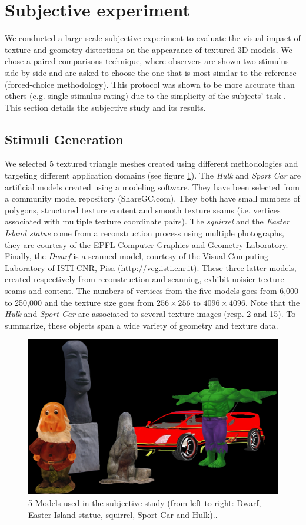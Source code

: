 \section{Subjective experiment}
We conducted a large-scale subjective experiment to evaluate the visual impact of texture and geometry distortions on the appearance of textured 3D models. We chose a paired comparisons technique, where observers are shown two stimulus side by side and are asked to choose the one that is most similar to the reference (forced-choice methodology). This protocol was shown to be more accurate than others (e.g. single stimulus rating) due to the simplicity of the subjects’ task \cite{Mantiuk2012}. This section details the subjective study and its results.

\subsection{Stimuli Generation}
We selected 5 textured triangle meshes created using different methodologies and targeting different application domains (see figure \ref{fig-ref}). The \textit{Hulk} and \textit{Sport Car} are artificial models created using a modeling software. They have been selected from a community model repository (ShareGC.com). They both have small numbers of polygons, structured texture content and smooth texture seams (i.e. vertices associated with multiple texture coordinate pairs). The \textit{squirrel} and the \textit{Easter Island statue} come from a reconstruction process using multiple photographs, they are courtesy of the EPFL Computer Graphics and Geometry Laboratory. Finally, the \textit{Dwarf} is a scanned model, courtesy of the Visual Computing Laboratory of ISTI-CNR, Pisa (http://vcg.isti.cnr.it). These three latter models, created respectively from reconstruction and scanning, exhibit noisier texture seams and content. The numbers of vertices from the five models goes from 6,000 to 250,000 and the texture size goes from $256\times256$ to $4096\times4096$. Note that the \textit{Hulk} and \textit{Sport Car} are associated to several texture images (resp. 2 and 15). To summarize, these objects span a wide variety of geometry and texture data.\\
\begin{figure}[htb]
  \centering
  \includegraphics[width=.7\linewidth]{allmodels}
  \caption{\label{fig-ref} 5 Models used in the subjective study (from left to right: Dwarf, Easter Island statue, squirrel, Sport Car and Hulk)..}
  \end{figure}
